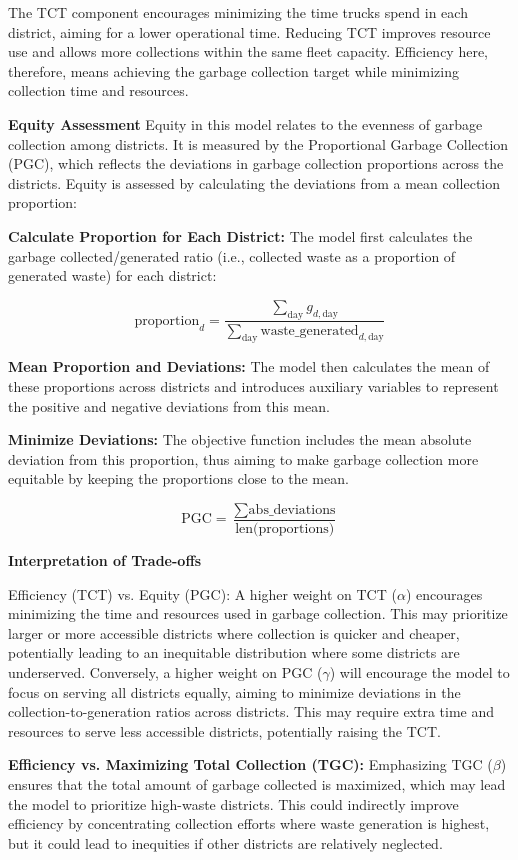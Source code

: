\documentclass{article}
\begin{document}
The TCT component encourages minimizing the time trucks spend in each district, aiming for a lower operational time. Reducing TCT improves resource use and allows more collections within the same fleet capacity. Efficiency here, therefore, means achieving the garbage collection target while minimizing collection time and resources.

\textbf{{Equity Assessment}}
Equity in this model relates to the evenness of garbage collection among districts. It is measured by the Proportional Garbage Collection (PGC), which reflects the deviations in garbage collection proportions across the districts. Equity is assessed by calculating the deviations from a mean collection proportion:

\textbf{{Calculate Proportion for Each District:} }
The model first calculates the garbage collected/generated ratio (i.e., collected waste as a proportion of generated waste) for each district:

\[
\text{proportion}_d = \frac{\sum_{\text{day}} g_{d,\text{day}}}{\sum_{\text{day}} \text{waste\_generated}_{d,\text{day}}}
\]

\textbf{{Mean Proportion and Deviations:} }
The model then calculates the mean of these proportions across districts and introduces auxiliary variables to represent the positive and negative deviations from this mean.

\textbf{{Minimize Deviations:} }
The objective function includes the mean absolute deviation from this proportion, thus aiming to make garbage collection more equitable by keeping the proportions close to the mean.

\[
\text{PGC} = \frac{\sum \text{abs\_deviations}}{\text{len(proportions)}}
\]

\textbf{{Interpretation of Trade-offs}}

{Efficiency (TCT) vs. Equity (PGC):}
A higher weight on TCT ($\alpha$) encourages minimizing the time and resources used in garbage collection. This may prioritize larger or more accessible districts where collection is quicker and cheaper, potentially leading to an inequitable distribution where some districts are underserved. Conversely, a higher weight on PGC ($\gamma$) will encourage the model to focus on serving all districts equally, aiming to minimize deviations in the collection-to-generation ratios across districts. This may require extra time and resources to serve less accessible districts, potentially raising the TCT.

\textbf{{Efficiency vs. Maximizing Total Collection (TGC):}}
Emphasizing TGC ($\beta$) ensures that the total amount of garbage collected is maximized, which may lead the model to prioritize high-waste districts. This could indirectly improve efficiency by concentrating collection efforts where waste generation is highest, but it could lead to inequities if other districts are relatively neglected.
\end{document}
